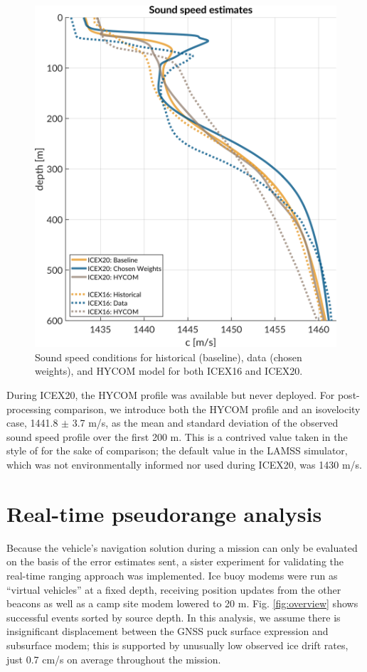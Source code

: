 \begin{figure}[h!]
	\centering
	\includegraphics[width=\reprintcolumnwidth]{figs/ssp-gvel-icex20-icex16.pdf}
	\caption{Sound speed conditions for historical (baseline), data (chosen weights), and HYCOM model for both ICEX16 and ICEX20.}
	\label{fig:sspExpectation}
\end{figure}

During ICEX20, the HYCOM profile was available but never deployed. 
For post-processing comparison, we introduce both the HYCOM profile and an isovelocity case, 1441.8 $\pm$ 3.7 m/s, as the mean and standard deviation of the observed sound speed profile over the first 200 m.
This is a contrived value taken in the style of \citet{Graupe2019} for the sake of comparison; the default value in the LAMSS simulator, which was not environmentally informed nor used during ICEX20, was 1430 m/s.

\clearpage
\section{\label{sec:realtime} Real-time pseudorange analysis}

Because the vehicle's navigation solution during a mission can only be evaluated on the basis of the error estimates sent, a sister experiment for validating the real-time ranging approach was implemented.
Ice buoy modems were run as ``virtual vehicles'' at a fixed depth, receiving position updates from the other beacons as well as a camp site modem lowered to 20 m. 
Fig. \ref{fig:overview} shows successful events sorted by source depth.
In this analysis, we assume there is insignificant displacement between the GNSS puck surface expression and subsurface modem; this is supported by unusually low observed ice drift rates, just 0.7 cm/s on average throughout the mission.

